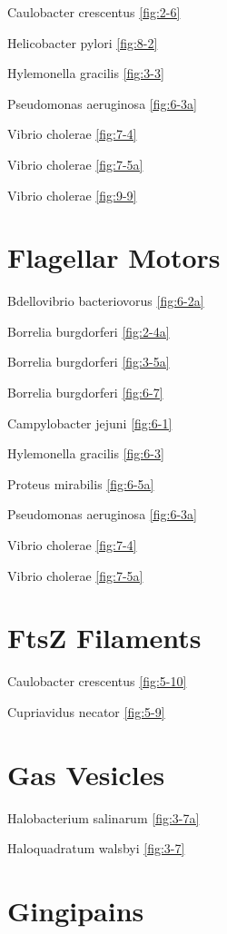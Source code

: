 \documentclass[]{tufte-book}
\begin{document}
Caulobacter crescentus \ref{fig:2-6}

Helicobacter pylori \ref{fig:8-2}

Hylemonella gracilis \ref{fig:3-3}

Pseudomonas aeruginosa \ref{fig:6-3a}

Vibrio cholerae \ref{fig:7-4}

Vibrio cholerae \ref{fig:7-5a}

Vibrio cholerae \ref{fig:9-9}

\section*{Flagellar Motors}\label{flagellar-motors}

Bdellovibrio bacteriovorus \ref{fig:6-2a}

Borrelia burgdorferi \ref{fig:2-4a}

Borrelia burgdorferi \ref{fig:3-5a}

Borrelia burgdorferi \ref{fig:6-7}

Campylobacter jejuni \ref{fig:6-1}

Hylemonella gracilis \ref{fig:6-3}

Proteus mirabilis \ref{fig:6-5a}

Pseudomonas aeruginosa \ref{fig:6-3a}

Vibrio cholerae \ref{fig:7-4}

Vibrio cholerae \ref{fig:7-5a}

\section*{FtsZ Filaments}\label{ftsz-filaments}

Caulobacter crescentus \ref{fig:5-10}

Cupriavidus necator \ref{fig:5-9}

\section*{Gas Vesicles}\label{gas-vesicles}

Halobacterium salinarum \ref{fig:3-7a}

Haloquadratum walsbyi \ref{fig:3-7}

\section*{Gingipains}\label{gingipains}
\end{document}
